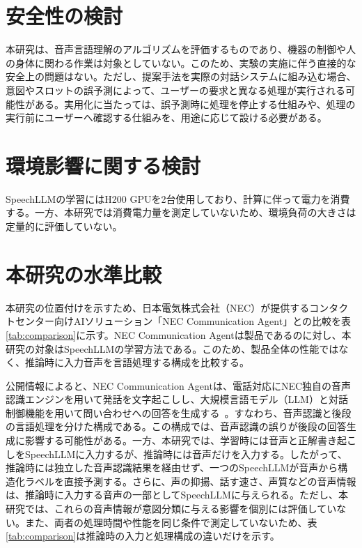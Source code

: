 \documentclass[11pt,a4paper]{ltjsarticle}
\begin{document}
\section{安全性の検討}
本研究は、音声言語理解のアルゴリズムを評価するものであり、機器の制御や人の身体に関わる作業は対象としていない。このため、実験の実施に伴う直接的な安全上の問題はない。ただし、提案手法を実際の対話システムに組み込む場合、意図やスロットの誤予測によって、ユーザーの要求と異なる処理が実行される可能性がある。実用化に当たっては、誤予測時に処理を停止する仕組みや、処理の実行前にユーザーへ確認する仕組みを、用途に応じて設ける必要がある。

\section{環境影響に関する検討}
SpeechLLMの学習にはH200 GPUを2台使用しており、計算に伴って電力を消費する。一方、本研究では消費電力量を測定していないため、環境負荷の大きさは定量的に評価していない。

\section{本研究の水準比較}
本研究の位置付けを示すため、日本電気株式会社（NEC）が提供するコンタクトセンター向けAIソリューション「NEC Communication Agent」との比較を表\ref{tab:comparison}に示す。NEC Communication Agentは製品であるのに対し、本研究の対象はSpeechLLMの学習方法である。このため、製品全体の性能ではなく、推論時に入力音声を言語処理する構成を比較する。

公開情報によると、NEC Communication Agentは、電話対応にNEC独自の音声認識エンジンを用いて発話を文字起こしし、大規模言語モデル（LLM）と対話制御機能を用いて問い合わせへの回答を生成する~\cite{nec_communication_agent}。すなわち、音声認識と後段の言語処理を分けた構成である。この構成では、音声認識の誤りが後段の回答生成に影響する可能性がある。一方、本研究では、学習時には音声と正解書き起こしをSpeechLLMに入力するが、推論時には音声だけを入力する。したがって、推論時には独立した音声認識結果を経由せず、一つのSpeechLLMが音声から構造化ラベルを直接予測する。さらに、声の抑揚、話す速さ、声質などの音声情報は、推論時に入力する音声の一部としてSpeechLLMに与えられる。ただし、本研究では、これらの音声情報が意図分類に与える影響を個別には評価していない。また、両者の処理時間や性能を同じ条件で測定していないため、表\ref{tab:comparison}は推論時の入力と処理構成の違いだけを示す。
\end{document}
